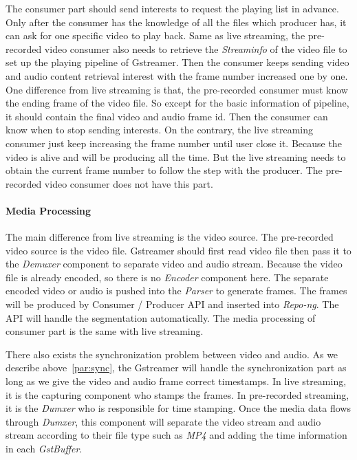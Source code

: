 The consumer part should send interests to request the playing list in advance. Only after the consumer has the knowledge of all the files which producer has, it can ask for one specific video to play back. Same as live streaming, the pre-recorded video consumer also needs to retrieve the \textit{Streaminfo} of the video file to set up the playing pipeline of Gstreamer. Then the consumer keeps sending video and audio content retrieval interest with the frame number increased one by one. One difference from live streaming is that, the pre-recorded consumer must know the ending frame of the video file. So except for the basic information of pipeline, it should contain the final video and audio frame id. Then the consumer can know when to stop sending interests. On the contrary, the live streaming consumer just keep increasing the frame number until user close it. Because the video is alive and will be producing all the time. But the live streaming needs to obtain the current frame number to follow the step with the producer. The pre-recorded video consumer does not have this part.

\paragraph{Media Processing}

The main difference from live streaming is the video source. The pre-recorded video source is the video file. Gstreamer should first read video file then pass it to the \textit{Demuxer} component to separate video and audio stream. Because the video file is already encoded, so there is no \textit{Encoder} component here. The separate encoded video or audio is pushed into the \textit{Parser} to generate frames. The frames will be produced by Consumer / Producer API and inserted into \textit{Repo-ng}. The API will handle the segmentation automatically. The media processing of consumer part is the same with live streaming.

There also exists the synchronization problem between video and audio. As we describe above~\ref{par:sync}, the Gstreamer will handle the synchronization part as long as we give the video and audio frame correct timestamps. In live streaming, it is the capturing component who stamps the frames. In pre-recorded streaming, it is the \textit{Dumxer} who is responsible for time stamping. Once the media data flows through \textit{Dumxer}, this component will separate the video stream and audio stream according to their file type such as \textit{MP4} and adding the time information in each \textit{GstBuffer}.

